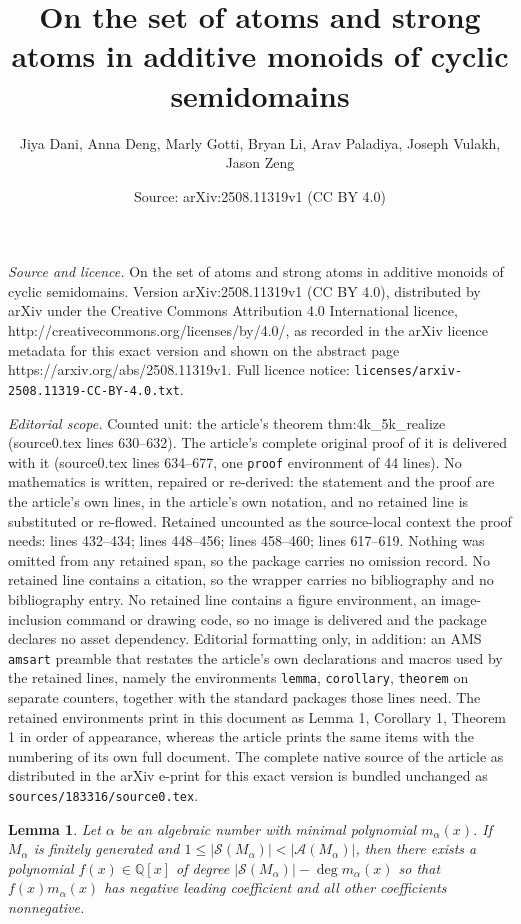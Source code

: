 \documentclass[10pt,a4paper]{amsart}
\title{On the set of atoms and strong atoms in additive monoids of cyclic semidomains}
\author{Jiya Dani, Anna Deng, Marly Gotti, Bryan Li, Arav Paladiya, Joseph Vulakh, Jason Zeng}
\date{Source: arXiv:2508.11319v1 (CC BY 4.0)}
\newtheorem{lemma}{Lemma}
\newcommand{\qq}{\mathbb{Q}}
\begin{document}
\maketitle

\noindent\emph{Source and licence.} On the set of atoms and strong atoms in additive monoids of cyclic semidomains. Version arXiv:2508.11319v1 (CC BY 4.0), distributed by arXiv under the Creative Commons Attribution 4.0 International licence, http://creativecommons.org/licenses/by/4.0/, as recorded in the arXiv licence metadata for this exact version and shown on the abstract page https://arxiv.org/abs/2508.11319v1. Full licence notice: \texttt{licenses/arxiv-2508.11319-CC-BY-4.0.txt}.\par\smallskip

\noindent\textit{Editorial scope.} Counted unit: the article's theorem thm:4k\_5k\_realize (source0.tex lines 630--632). The article's complete original proof of it is delivered with it (source0.tex lines 634--677, one \texttt{proof} environment of 44 lines). No mathematics is written, repaired or re-derived: the statement and the proof are the article's own lines, in the article's own notation, and no retained line is substituted or re-flowed.  Retained uncounted as the source-local context the proof needs: lines 432--434; lines 448--456; lines 458--460; lines 617--619.  Nothing was omitted from any retained span, so the package carries no omission record.  No retained line contains a citation, so the wrapper carries no bibliography and no bibliography entry.  No retained line contains a figure environment, an image-inclusion command or drawing code, so no image is delivered and the package declares no asset dependency.  Editorial formatting only, in addition: an AMS \texttt{amsart} preamble that restates the article's own declarations and macros used by the retained lines, namely the environments \texttt{lemma}, \texttt{corollary}, \texttt{theorem} on separate counters, together with the standard packages those lines need.  The retained environments print in this document as Lemma 1, Corollary 1, Theorem 1 in order of appearance, whereas the article prints the same items with the numbering of its own full document.  The complete native source of the article as distributed in the arXiv e-print for this exact version is bundled unchanged as \texttt{sources/183316/source0.tex}.
\begin{lemma} \label{lem:strong atom as sum of lower degree terms}
    Let $\alpha$ be an algebraic number with minimal polynomial $m_\alpha(x)$. If~$M_\alpha$ is finitely generated and $1 \le |\mathcal{S}(M_\alpha)| < |\mathcal{A}(M_\alpha)|$, then there exists a polynomial $f(x) \in \qq[x]$ of degree $|\mathcal{S}(M_\alpha)| - \deg m_\alpha(x)$ so that $f(x)m_\alpha(x)$ has negative leading coefficient and all other coefficients nonnegative.
\end{lemma}
\end{document}
